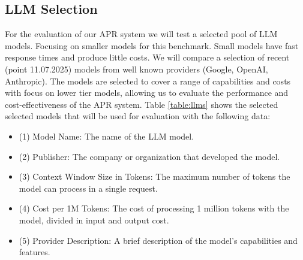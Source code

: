 \subsection{LLM Selection} \label{subsection:llm-selection}

For the evaluation of our APR system we will test a selected pool of LLM models. Focusing on smaller models for this benchmark. Small models have fast response times and produce little costs. We will compare a selection of recent (point 11.07.2025) models from well known providers (Google, OpenAI, Anthropic). The models are selected to cover a range of capabilities and costs with focus on lower tier models, allowing us to evaluate the performance and cost-effectiveness of the APR system. Table \ref{table:llms} shows the selected selected models that will be used for evaluation with the following data:

\begin{itemize}
    \item (1) Model Name: The name of the LLM model.
    \item (2) Publisher: The company or organization that developed the model.
    \item (3) Context Window Size in Tokens: The maximum number of tokens the model can process in a single request.
    \item (4) Cost per 1M Tokens: The cost of processing 1 million tokens with the model, divided in input and output cost.
    \item (5) Provider Description: A brief description of the model's capabilities and features.
\end{itemize}

